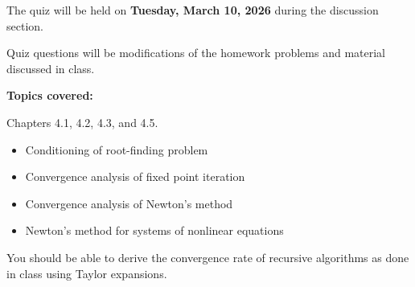 \documentclass[reqno]{exam}
\begin{document}
The quiz will be held on {\bf Tuesday, March 10, 2026} during the discussion section.

Quiz questions will be modifications of the homework problems and material discussed in class.

\textbf{Topics covered:} 

Chapters 4.1, 4.2, 4.3, and 4.5.

\begin{itemize}
    \item Conditioning of root-finding problem
    \item Convergence analysis of fixed point iteration
    \item Convergence analysis of Newton's method
    \item Newton's method for systems of nonlinear equations
\end{itemize}

You should be able to derive the convergence rate of recursive algorithms as done in class using Taylor expansions.
\end{document}
